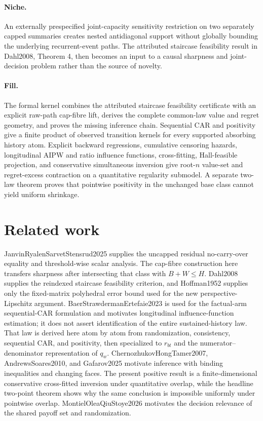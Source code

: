 \documentclass{article}
\begin{document}
\paragraph{Niche.} An externally prespecified joint-capacity sensitivity restriction on two separately capped summaries creates nested antidiagonal support without globally bounding the underlying recurrent-event paths. The attributed staircase feasibility result in Dahl2008, Theorem 4, then becomes an input to a causal sharpness and joint-decision problem rather than the source of novelty.

\paragraph{Fill.} The formal kernel combines the attributed staircase feasibility certificate with an explicit raw-path cap-fibre lift, derives the complete common-law value and regret geometry, and proves the missing inference chain. Sequential CAR and positivity give a finite product of observed transition kernels for every supported absorbing history atom. Explicit backward regressions, cumulative censoring hazards, longitudinal AIPW and ratio influence functions, cross-fitting, Hall-feasible projection, and conservative simultaneous inversion give root-\(n\) value-set and regret-excess contraction on a quantitative regularity submodel. A separate two-law theorem proves that pointwise positivity in the unchanged base class cannot yield uniform shrinkage.

\section{Related work}

JanvinRyalenSarvetStensrud2025 supplies the uncapped residual no-carry-over equality and threshold-wise scalar analysis. The cap-fibre construction here transfers sharpness after intersecting that class with \(B+W\le H\). Dahl2008 supplies the reindexed staircase feasibility criterion, and Hoffman1952 supplies only the fixed-matrix polyhedral error bound used for the new perspective-Lipschitz argument. BaerStrawdermanErtefaie2023 is used for the factual-arm sequential-CAR formulation and motivates longitudinal influence-function estimation; it does not assert identification of the entire sustained-history law. That law is derived here atom by atom from randomization, consistency, sequential CAR, and positivity, then specialized to \(r_{bt}\) and the numerator--denominator representation of \(q_w\). ChernozhukovHongTamer2007, AndrewsSoares2010, and Gafarov2025 motivate inference with binding inequalities and changing faces. The present positive result is a finite-dimensional conservative cross-fitted inversion under quantitative overlap, while the headline two-point theorem shows why the same conclusion is impossible uniformly under pointwise overlap. MontielOleaQiuStoye2026 motivates the decision relevance of the shared payoff set and randomization.
\end{document}
